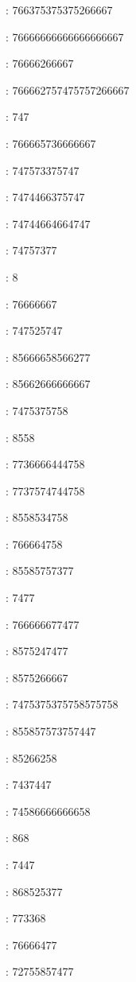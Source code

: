 : 766375375375266667\par
{}: 76666666666666666667\par
{}: 76666266667\par
{}: 766662757475757266667\par
{}: 747\par
{}: 766665736666667\par
{}: 747573375747\par
{}: 7474466375747\par
{}: 74744664664747\par
{}: 74757377\par
{}: 8\par
{}: 76666667\par
{}: 747525747\par
{}: 85666658566277\par
{}: 85662666666667\par
{}: 7475375758\par
{}: 8558\par
{}: 7736666444758\par
{}: 7737574744758\par
{}: 8558534758\par
{}: 766664758\par
{}: 85585757377\par
{}: 7477\par
{}: 766666677477\par
{}: 8575247477\par
{}: 8575266667\par
{}: 7475375375758575758\par
{}: 855857573757447\par
{}: 85266258\par
{}: 7437447\par
{}: 74586666666658\par
{}: 868\par
{}: 7447\par
{}: 868525377\par
{}: 773368\par
{}: 76666477\par
{}: 72755857477\par
